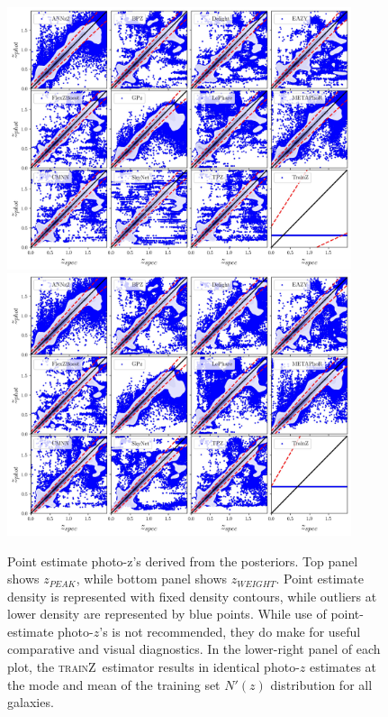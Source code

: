 \documentclass[usenatbib]{mn2e}
\newcommand{\trainz}{\textsc{trainZ}}
\begin{document}
\begin{figure}
\centering
\includegraphics[width=0.9\textwidth]{figures/ZPEAK_szpz_threecolumn_12codes_navy.jpg}
\includegraphics[width=0.9\textwidth]{figures/ZWEIGHT_szpz_threecolumn_12codes_navy.jpg}
\caption{Point estimate photo-z's derived from the posteriors. Top panel shows $z_{PEAK}$, while bottom panel shows $z_{WEIGHT}$.  Point estimate density is represented with fixed density contours, while outliers at lower density are represented by blue points.  While use of point-estimate photo-$z$'s is not recommended, they do make for useful comparative and visual diagnostics.  In the lower-right panel of each plot, the \trainz\ estimator results in identical photo-$z$ estimates at the mode and mean of the training set $N'(z)$ distribution for all galaxies.} \label{fig:pz_pointestimates}
\end{figure}
\end{document}
